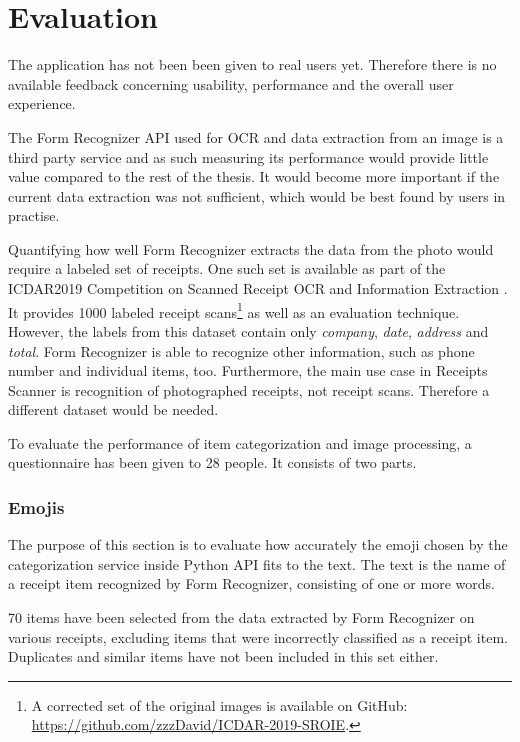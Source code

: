 \documentclass[
  digital, %
  table,   %
  oneside, %
  lof,     %
  lot,     %
]{fithesis3}
\begin{document}


\chapter{Evaluation}
The application has not been been given to real users yet. Therefore there is no available feedback concerning usability, performance and the overall user experience.

The Form Recognizer API used for OCR and data extraction from an image is a third party service and as such measuring its performance would provide little value compared to the rest of the thesis. It would become more important if the current data extraction was not sufficient, which would be best found by users in practise. 

Quantifying how well Form Recognizer extracts the data from the photo would require a labeled set of receipts. One such set is available as part of the ICDAR2019 Competition on Scanned Receipt OCR
and Information Extraction \cite{ICDAR2019}. It provides \num{1000} labeled receipt scans\footnote{A corrected set of the original images is available on GitHub: \url{https://github.com/zzzDavid/ICDAR-2019-SROIE}.} as well as an evaluation technique. However, the labels from this dataset contain only \textit{company}, \textit{date}, \textit{address} and \textit{total}. Form Recognizer is able to recognize other information, such as phone number and individual items, too. Furthermore, the main use case in Receipts Scanner is recognition of photographed receipts, not receipt scans. Therefore a different dataset would be needed.

To evaluate the performance of item categorization and image processing, a questionnaire has been given to 28 people. It consists of two parts.

\subsection{Emojis}
The purpose of this section is to evaluate how accurately the emoji chosen by the categorization service inside Python API fits to the text. The text is the name of a receipt item recognized by Form Recognizer, consisting of one or more words.

70 items have been selected from the data extracted by Form Recognizer on various receipts, excluding items that were incorrectly classified as a receipt item. Duplicates and similar items have not been included in this set either.
\end{document}
